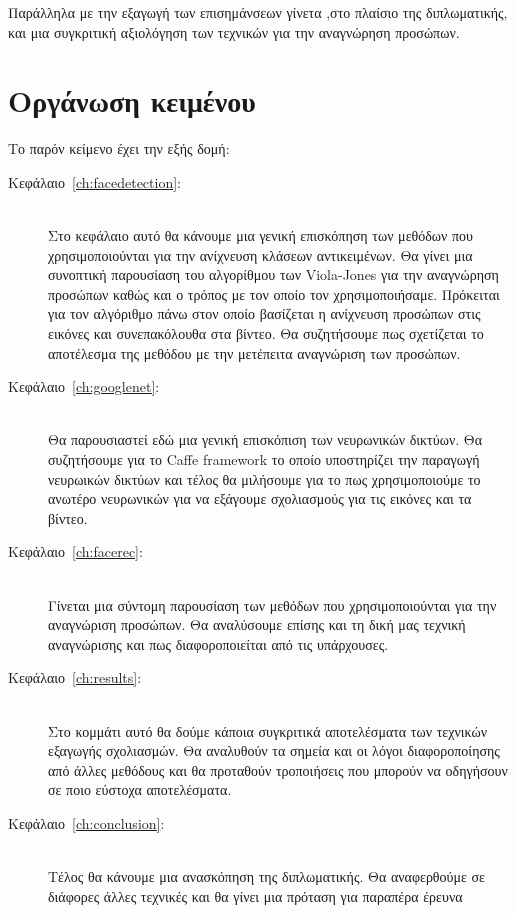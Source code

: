Παράλληλα με την εξαγωγή των επισημάνσεων γίνετα ,στο πλαίσιο της διπλωματικής,
και μια συγκριτική αξιολόγηση των τεχνικών για την αναγνώρηση προσώπων.

\section{Οργάνωση κειμένου}

Το παρόν κείμενο έχει την εξής δομή:

\begin{description}
  \item[Κεφάλαιο~\ref{ch:facedetection}:] \hfill \\
    Στο κεφάλαιο αυτό θα κάνουμε μια γενική επισκόπηση των μεθόδων που
    χρησιμοποιούνται για την ανίχνευση κλάσεων αντικειμένων.
    Θα γίνει μια συνοπτική παρουσίαση του αλγορίθμου των Viola-Jones για την
    αναγνώρηση προσώπων καθώς
    και ο τρόπος με τον οποίο τον χρησιμοποιήσαμε. Πρόκειται για τον αλγόριθμο
    πάνω στον οποίο βασίζεται η ανίχνευση προσώπων στις εικόνες και συνεπακόλουθα
    στα βίντεο. Θα συζητήσουμε πως σχετίζεται το αποτέλεσμα της μεθόδου με
    την μετέπειτα αναγνώριση των προσώπων.
  \item[Κεφάλαιο~\ref{ch:googlenet}:] \hfill \\
    Θα παρουσιαστεί εδώ μια γενική επισκόπιση των νευρωνικών δικτύων. Θα συζητήσουμε
    για το Caffe framework το οποίο υποστηρίζει την παραγωγή νευρωικών δικτύων
    και τέλος θα μιλήσουμε για το πως χρησιμοποιούμε το ανωτέρο νευρωνικών
    για να εξάγουμε σχολιασμούς για τις εικόνες και τα βίντεο.
  \item[Κεφάλαιο~\ref{ch:facerec}:] \hfill \\
    Γίνεται μια σύντομη παρουσίαση των μεθόδων που χρησιμοποιούνται για την
    αναγνώριση προσώπων. Θα αναλύσουμε επίσης και τη δική μας τεχνική αναγνώρισης
    και πως διαφοροποιείται από τις υπάρχουσες.
  \item[Κεφάλαιο~\ref{ch:results}:] \hfill \\
    Στο κομμάτι αυτό θα δούμε κάποια συγκριτικά αποτελέσματα των τεχνικών
    εξαγωγής σχολιασμών. Θα αναλυθούν τα σημεία και οι λόγοι διαφοροποίησης
    από άλλες μεθόδους και θα προταθούν τροποιήσεις που μπορούν να οδηγήσουν
    σε ποιο εύστοχα αποτελέσματα.
  \item[Κεφάλαιο~\ref{ch:conclusion}:] \hfill \\
    Τέλος θα κάνουμε μια ανασκόπηση της διπλωματικής. Θα αναφερθούμε σε διάφορες
    άλλες τεχνικές και θα γίνει μια πρόταση για παραπέρα έρευνα
\end{description}

